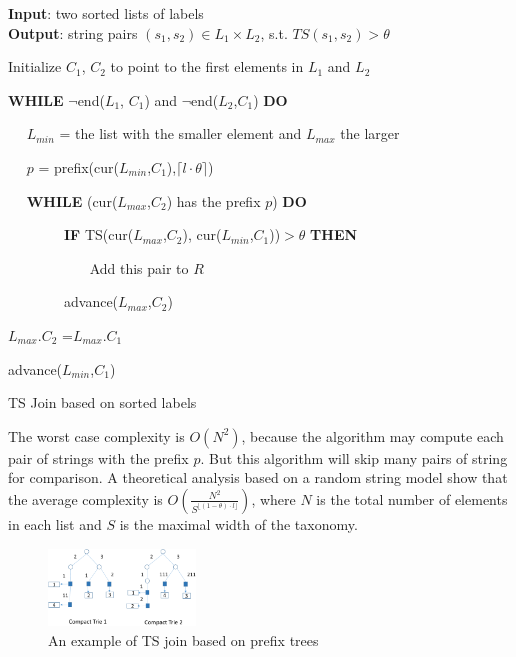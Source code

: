\begin{algorithm}
{\bf Input}: two sorted lists of labels \\
{\bf Output}: string pairs $(s_1,s_2) \in L_1 \times L_2$, s.t. $TS(s_1, s_2) > \theta$
\begin{compactenum}[(1)]
\item Initialize  $C_1$, $C_2$ to point to the first elements in $L_1$ and $L_2$
\item {\bf WHILE}  $\neg$end($L_1$, $C_1$) and $\neg$end($L_2$,$C_1$) {\bf DO}
\item ~~ $L_{min}$ = the list with the smaller element and $L_{max}$ the larger
\item ~~ $p$ = prefix(cur($L_{min}$,$C_1$),$  \lceil l \cdot \theta \rceil$)
\item ~~ {\bf WHILE} (cur($L_{max}$,$C_2$) has the prefix $p$) {\bf DO}
\item ~~ ~~ ~~ {\bf IF} TS(cur($L_{max}$,$C_2$), cur($L_{min}$,$C_1$))$> \theta$ {\bf THEN}
\item ~~~   ~~ ~~ ~~ Add this pair to $R$
\item ~~ ~~ ~~  advance($L_{max}$,$C_2$)
\item $L_{max}.C_2$ =$L_{max}.C_1$
\item advance($L_{min}$,$C_1$)
\end{compactenum}
\caption{TS Join based on sorted labels}
\label{alg:exactjoin}
\end{algorithm}

The worst case complexity is $O(N^2)$, because the algorithm may compute each pair of strings with the prefix $p$. But this algorithm will skip many pairs of string for comparison. A theoretical analysis based on a random string model show that the average complexity is $O(\frac{N^2}{S^{\lfloor (1-\theta) \cdot l \rfloor}})$, where $N$ is the total number of elements in each list and $S$ is the maximal width of the taxonomy.


\begin{figure}[t]
\centering
\includegraphics[width=0.35\textwidth]{figures/prefixTrees}
 \caption{An example of TS join based on prefix trees}
\label{fig:taxonomyexample}
\end{figure}


